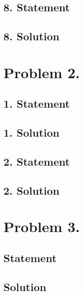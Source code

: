 \subsection{8. Statement}
\subsection{8. Solution}

\section{Problem 2.}
\subsection{1. Statement}
\subsection{1. Solution}
\subsection{2. Statement}
\subsection{2. Solution}

\section{Problem 3.}
\subsection{Statement}
\subsection{Solution}

\EndNoBibArticle
